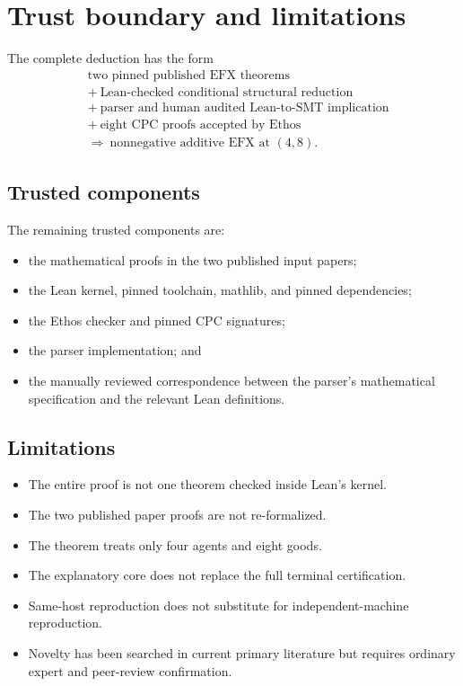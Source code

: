 \documentclass[11pt]{article}
\theoremstyle{definition}
\begin{document}
\section{Trust boundary and limitations}\label{sec:trust}

The complete deduction has the form
\[
\begin{aligned}
&\text{two pinned published EFX theorems}\\
&+\ \text{Lean-checked conditional structural reduction}\\
&+\ \text{parser and human audited Lean-to-SMT implication}\\
&+\ \text{eight CPC proofs accepted by Ethos}\\
&\Longrightarrow\ \text{nonnegative additive EFX at }(4,8).
\end{aligned}
\]

\subsection{Trusted components}

The remaining trusted components are:
\begin{itemize}[leftmargin=1.8em]
  \item the mathematical proofs in the two published input papers;
  \item the Lean kernel, pinned toolchain, mathlib, and pinned dependencies;
  \item the Ethos checker and pinned CPC signatures;
  \item the parser implementation; and
  \item the manually reviewed correspondence between the parser's
  mathematical specification and the relevant Lean definitions.
\end{itemize}

\subsection{Limitations}

\begin{itemize}[leftmargin=1.8em]
  \item The entire proof is not one theorem checked inside Lean's kernel.
  \item The two published paper proofs are not re-formalized.
  \item The theorem treats only four agents and eight goods.
  \item The explanatory core does not replace the full terminal
  certification.
  \item Same-host reproduction does not substitute for independent-machine
  reproduction.
  \item Novelty has been searched in current primary literature but requires
  ordinary expert and peer-review confirmation.
\end{itemize}
\end{document}
